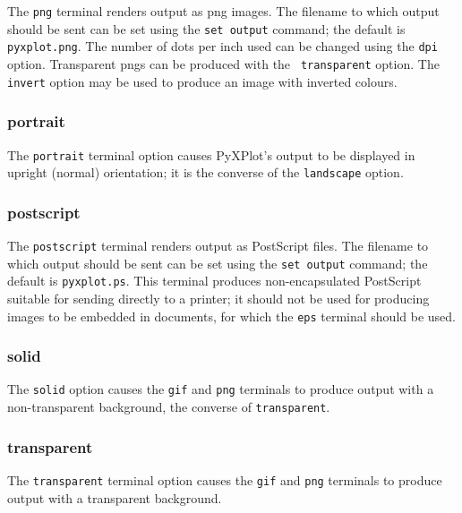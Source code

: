 The {\tt png} terminal renders output as png images. The filename to which
output should be sent can be set using the {\tt set output} command; the
default is {\tt pyxplot.png}. The number of dots per inch used can be changed
using the {\tt dpi} option. Transparent pngs can be produced with the {\tt
transparent} option. The {\tt invert} option may be used to produce an image
with inverted colours.


\subsubsection{portrait}

The {\tt portrait} terminal option causes PyXPlot's output to be displayed in
upright (normal) orientation; it is the converse of the {\tt landscape} option.


\subsubsection{postscript}

The {\tt postscript} terminal renders output as PostScript files. The filename
to which output should be sent can be set using the {\tt set output} command;
the default is {\tt pyxplot.ps}.  This terminal produces non-encapsulated
PostScript suitable for sending directly to a printer; it should not be used
for producing images to be embedded in documents, for which the {\tt eps}
terminal should be used.


\subsubsection{solid}

The {\tt solid} option causes the {\tt gif} and {\tt png} terminals to produce
output with a non-transparent background, the converse of {\tt transparent}.


\subsubsection{transparent}

The {\tt transparent} terminal option causes the {\tt gif} and {\tt png}
terminals to produce output with a transparent background.


